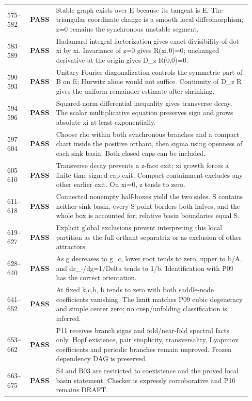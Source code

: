 \documentclass[11pt]{article}
\newcommand{\pass}{\textbf{PASS}}
\begin{document}
\begin{longtable}{@{}p{}p{}p{}@{}}
575--582 & \pass & Stable graph exists over E because its tangent is E. The triangular coordinate change is a smooth local diffeomorphism; z=0 remains the synchronous unstable segment.\\
583--589 & \pass & Hadamard integral factorization gives exact divisibility of dot-xi by xi. Invariance of z=0 gives R(xi,0)=0; unchanged derivative at the origin gives D\_z R(0,0)=0.\\
590--593 & \pass & Unitary Fourier diagonalization controls the symmetric part of B on E; Hurwitz alone would not suffice. Continuity of D\_z R gives the uniform remainder estimate after shrinking.\\
594--596 & \pass & Squared-norm differential inequality gives transverse decay. The scalar multiplicative equation preserves sign and grows absolute xi at least exponentially.\\
597--604 & \pass & Choose rho within both synchronous branches and a compact chart inside the positive orthant, then sigma using openness of each sink basin. Both closed caps can be included.\\
605--610 & \pass & Transverse decay prevents a z-face exit; xi growth forces a finite-time signed cap exit. Compact containment excludes any other earlier exit. On xi=0, z tends to zero.\\
611--618 & \pass & Connected nonempty half-boxes yield the two sides. S contains neither sink basin, every S point borders both halves, and the whole box is accounted for; relative basin boundaries equal S.\\
619--627 & \pass & Explicit global exclusions prevent interpreting this local partition as the full orthant separatrix or as exclusion of other attractors.\\
628--640 & \pass & As g decreases to g\_c, lower root tends to zero, upper to b/A, and dr\_-/dg=1/Delta tends to 1/b. Identification with P09 has the correct orientation.\\
641--652 & \pass & At fixed k,c,h, b tends to zero with both saddle-node coefficients vanishing. The limit matches P09 cubic degeneracy and simple center zero; no cusp/unfolding classification is inferred.\\
653--662 & \pass & P11 receives branch signs and fold/near-fold spectral facts only. Hopf existence, pair simplicity, transversality, Lyapunov coefficients and periodic branches remain unproved. Frozen dependency DAG is preserved.\\
663--675 & \pass & S4 and B03 are restricted to coexistence and the proved local basin statement. Checker is expressly corroborative and P10 remains DRAFT.\\

\end{longtable}
\end{document}
